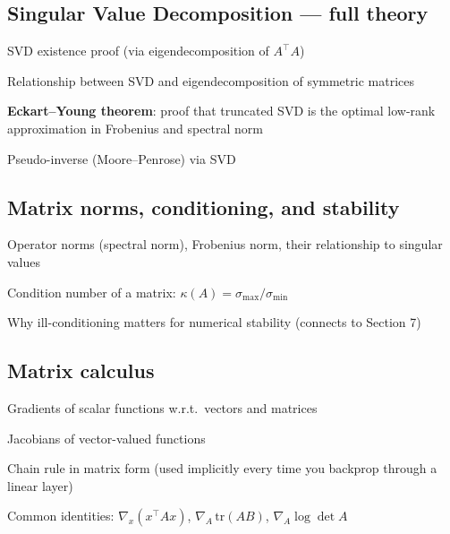 \subsection{Singular Value Decomposition — full theory}
\begin{tasklist}
    \item SVD existence proof (via eigendecomposition of $A^\top A$)
    \item Relationship between SVD and eigendecomposition of symmetric matrices
    \item \textbf{Eckart--Young theorem}: proof that truncated SVD is the optimal low-rank approximation in Frobenius and spectral norm
    \item Pseudo-inverse (Moore--Penrose) via SVD
\end{tasklist}

\subsection{Matrix norms, conditioning, and stability}
\begin{tasklist}
    \item Operator norms (spectral norm), Frobenius norm, their relationship to singular values
    \item Condition number of a matrix: $\kappa(A) = \sigma_{\max}/\sigma_{\min}$
    \item Why ill-conditioning matters for numerical stability (connects to Section 7)
\end{tasklist}

\subsection{Matrix calculus}
\begin{tasklist}
    \item Gradients of scalar functions w.r.t.\ vectors and matrices
    \item Jacobians of vector-valued functions
    \item Chain rule in matrix form (used implicitly every time you backprop through a linear layer)
    \item Common identities: $\nabla_x (x^\top A x)$, $\nabla_A \,\text{tr}(AB)$, $\nabla_A \log\det A$
\end{tasklist}

